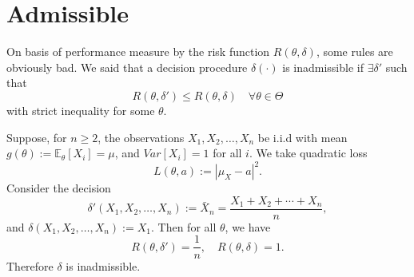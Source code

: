 \section{Admissible}

On basis of performance measure by the risk function $R(\theta, \delta)$, some rules are obviously bad. We said that 
a decision procedure $\delta (\cdot)$ is inadmissible if $\exists \delta'$ such that
\begin{equation}
    R(\theta, \delta') \leq R(\theta, \delta) \quad \forall \theta \in \Theta
\end{equation}
with strict inequality for some $\theta$.

\begin{example}
    Suppose, for $n \geq 2$, the observations $X_1, X_2, \ldots, X_n$ be i.i.d with mean 
    $g(\theta) := \mathbb{E}_\theta[X_i] = \mu$, and $Var[X_i] = 1$ for all $i$. We take quadratic loss 
    \[
        L(\theta, a) := |\mu_X - a|^2.
    \]
    Consider the decision 
    \[
    \delta'(X_1, X_2, \ldots, X_n) := \bar{X}_n = \frac{X_1 + X_2 + \cdots + X_n}{n},
    \]
    and $\delta(X_1, X_2, \ldots, X_n) := X_1$. Then for all $\theta$, we have 
    \[
        R(\theta, \delta') = \frac{1}{n}, \quad R(\theta, \delta) = 1.
    \]
    Therefore $\delta$ is inadmissible.
\end{example}